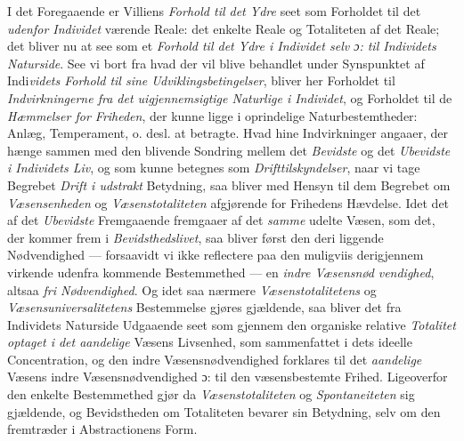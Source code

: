 I det Foregaaende er Villiens \emph{Forhold til det Ydre} seet som Forholdet til
det \emph{udenfor Individet} værende Reale: det enkelte Reale og Totaliteten af
det Reale; det bliver nu at see som et \emph{Forhold til det Ydre i Individet
selv ɔ: til Individets Naturside}. See vi bort fra hvad der vil blive behandlet
under Synspunktet af Indi\emph{videts Forhold til sine Udviklingsbetingelser},
bliver her Forholdet til \emph{Indvirkningerne fra det uigjennemsigtige
Naturlige i Individet}, og Forholdet til de \emph{Hæmmelser for Friheden}, der
kunne ligge i oprindelige Naturbestemtheder: Anlæg, Temperament, o. desl. at
betragte. Hvad hine Indvirkninger angaaer, der hænge sammen med den blivende
Sondring mellem det \emph{Bevidste} og det \emph{Ubevidste i Individets Liv}, og
som kunne betegnes som \emph{Drifttilskyndelser}, naar vi tage Begrebet
\emph{Drift i udstrakt} Betydning, saa bliver med Hensyn til dem Begrebet om
\emph{Væsensenheden} og \emph{Væsenstotaliteten} afgjørende for Frihedens
Hævdelse. Idet det af det \emph{Ubevidste} Fremgaaende fremgaaer af det
\emph{samme} udelte Væsen, som det, der kommer frem i \emph{Bevidsthedslivet},
saa bliver først den deri liggende Nødvendighed --- forsaavidt vi ikke
reflectere paa den muligviis derigjennem virkende udenfra kommende Bestemmethed
--- en \emph{indre Væsensnød}\-%
\emph{vendighed}, altsaa \emph{fri Nødvendighed}. Og idet saa nærmere
\emph{Væsenstotalitetens} og \emph{Væsensuniversalitetens} Bestemmelse gjøres
gjældende, saa bliver det fra Individets Naturside Udgaaende seet som gjennem
den organiske relative \emph{Totalitet optaget i det aandelige} Væsens
Livsenhed, som sammenfattet i dets ideelle Concentration, og den indre
Væsensnødvendighed forklares til det \emph{aandelige} Væsens indre
Væsensnødvendighed ɔ: til den væsensbestemte Frihed. Ligeoverfor den enkelte
Bestemmethed gjør da \emph{Væsenstotaliteten} og \emph{Spontaneiteten} sig
gjældende, og Bevidstheden om Totaliteten bevarer sin Betydning, selv om den
fremtræder i Abstractionens Form.

